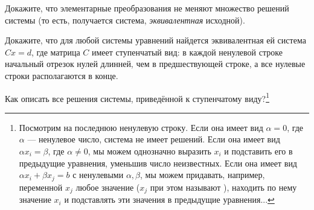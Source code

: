 \documentclass[a4paper,12pt]{article}
\begin{document}
 Докажите, что элементарные преобразования не меняют множество решений системы (то есть, получается система, {\em эквивалентная} исходной).
	
 Докажите, что для любой системы уравнений
найдется эквивалентная ей система $Cx = d$, где матрица $C$ имеет
ступенчатый вид: в каждой ненулевой строке начальный отрезок нулей
длинней, чем в предшествующей строке, а все нулевые строки
располагаются в конце. 

 Как описать все решения системы, приведённой к ступенчатому виду?\footnote{ Посмотрим на последнюю ненулевую строку. Если она имеет вид $\alpha=0$, где $\alpha$ --- ненулевое число, система не имеет решений. Если она имеет вид $\alpha x_i=\beta$, где $\alpha\ne0$, мы можем однозначно выразить $x_i$ и подставить его в предыдущие уравнения, уменьшив число неизвестных. Если она имеет вид $\alpha x_i+\beta x_j=b$ с ненулевыми $\alpha,\beta$, мы можем придавать, например, переменной $x_j$ любое значение ($x_j$ при этом называют ), находить по нему значение $x_i$ и подставлять эти значения в предыдущие уравнения...}



	

\end{document}
